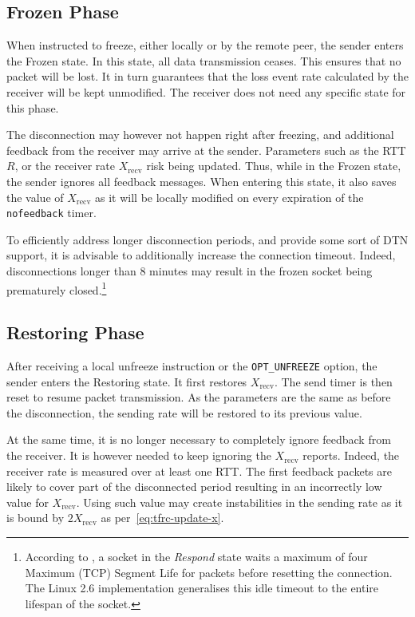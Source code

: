 \documentclass[twocolumn]{nictatechreport}
\begin{document}
\subsection{Frozen Phase}

When instructed to freeze, either locally or by the remote peer, the sender
enters the Frozen state. In this state, all data transmission ceases. This
ensures that no packet will be lost. It in turn guarantees that the loss event
rate calculated by the receiver will be kept unmodified. The receiver does not
need any specific state for this phase.

The disconnection may however not happen right after freezing, and additional
feedback from the receiver may arrive at the sender. Parameters such as the
RTT $R$, or the receiver rate $X_\mathrm{recv}$ risk being updated. Thus,
while in the Frozen state, the sender ignores all feedback messages. When
entering this state, it also saves the value of $X_\mathrm{recv}$ as it will be
locally modified on every expiration of the \verb#nofeedback# timer.

To efficiently address longer disconnection periods, and provide some sort of
DTN support, it is advisable to additionally increase the connection timeout.
Indeed, disconnections longer than 8 minutes may result in the frozen socket
being prematurely closed.\footnote{According to \cite{rfc4340}, a socket in the
\emph{Respond} state waits a maximum of four Maximum (TCP) Segment Life for
packets before resetting the connection. The Linux 2.6 implementation
generalises this idle timeout to the entire lifespan of the socket.}

\subsection{Restoring Phase}

After receiving a local unfreeze instruction or the \verb#OPT_UNFREEZE# option,
the sender enters the Restoring state. It first restores $X_\mathrm{recv}$.  The
send timer is then reset to resume packet transmission.  As the parameters are
the same as before the disconnection, the sending rate will be restored to its
previous value.

At the same time, it is no longer necessary to completely ignore feedback from
the receiver. It is however needed to keep ignoring the $X_\mathrm{recv}$
reports. Indeed, the receiver rate is measured over at least one RTT. The first
feedback packets are likely to cover part of the disconnected period resulting
in an incorrectly low value for $X_\mathrm{recv}$. Using such value may create
instabilities in the sending rate as it is bound by $2X_\mathrm{recv}$ as
per~\eqref{eq:tfrc-update-x}.
\end{document}
